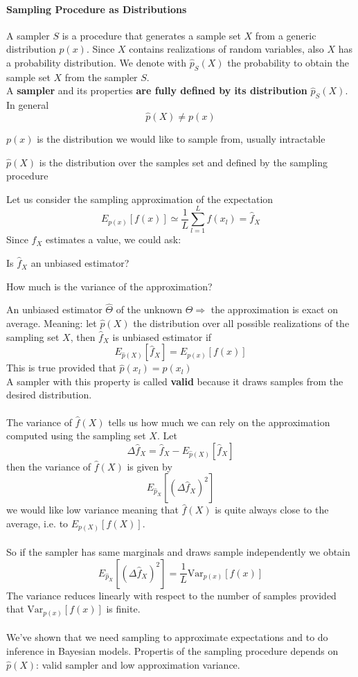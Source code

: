 \documentclass[10pt]{report}
\begin{document}
\paragraph{Sampling Procedure as Distributions} A sampler $S$ is a procedure that generates a sample set $X$ from a generic distribution $p(x)$. Since $X$ contains realizations of random variables, also $X$ has a probability distribution. We denote with $\hat{p}_S(X)$ the probability to obtain the sample set $X$ from the sampler $S$.\\
A \textbf{sampler} and its properties \textbf{are fully defined by its distribution} $\hat{p}_S(X)$. In general
$$\hat{p}(X) \neq p(x)$$
\begin{list}{}{}
	\item $p(x)$ is the distribution we would like to sample from, usually intractable
	\item $\hat{p}(X)$ is the distribution over the samples set and defined by the sampling procedure
\end{list}
Let us consider the sampling approximation of the expectation
$$E_{p(x)}[f(x)]\simeq \frac{1}{L}\sum_{l=1}^L f(x_l) = \hat{f}_X$$
Since $\hat{f}_X$ estimates a value, we could ask:
\begin{list}{}{}
	\item Is $\hat{f}_X$ an unbiased estimator?
	\item How much is the variance of the approximation?
\end{list}
An unbiased estimator $\hat{\Theta}$ of the unknown $\Theta \Rightarrow$ the approximation is exact on average. Meaning: let $\hat{p}(X)$ the distribution over all possible realizations of the sampling set $X$, then $\hat{f}_X$ is unbiased estimator if $$E_{\hat{p}(X)}[\hat{f}_X] = E_{p(x)}[f(x)]$$
This is true provided that $\hat{p}(x_l) = p(x_l)$\\
A sampler with this property is called \textbf{valid} because it draws samples from the desired distribution.\\\\
The variance of $\hat{f}(X)$ tells us how much we can rely on the approximation computed using the sampling set $X$. Let $$\Delta\hat{f}_X = \hat{f}_X - E_{\hat{p}(X)}[\hat{f}_X]$$ then the variance of $\hat{f}(X)$ is given by $$E_{\hat{p}_X}[(\Delta\hat{f}_X)^2]$$
we would like low variance meaning that $\hat{f}(X)$ is quite always close to the average, i.e. to $E_{p(X)}[f(X)]$.\\\\
So if the sampler has same marginals and draws sample independently we obtain $$E_{\hat{p}_X}[(\Delta \hat{f}_X)^2] = \frac{1}{L}\text{Var}_{p(x)}[f(x)]$$
The variance reduces linearly with respect to the number of samples provided that $\text{Var}_{p(x)}[f(x)]$ is finite.\\\\
We've shown that we need sampling to approximate expectations and to do inference in Bayesian models. Propertis of the sampling procedure depends on $\hat{p}(X)$: valid sampler and low approximation variance.
\end{document}

